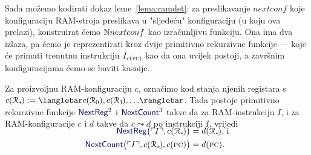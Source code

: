 Sada možemo kodirati dokaz leme~\ref{lema:ramdet}: za preslikavanje $nextconf$ koje konfiguraciju RAM-stroja preslikava u "sljedeću" konfiguraciju (u koju ova prelazi), konstruirat ćemo ${\mathbb N} nextconf$ kao izračunljivu funkciju. Ona ima dva izlaza, pa ćemo je reprezentirati kroz dvije primitivno rekurzivne funkcije --- koje će primati trenutnu instrukciju $I_{c(\textsc{pc})}$ kao da ona uvijek postoji, a završnim konfiguracijama ćemo se baviti kasnije.

\begin{lema}[{name=[primitivna rekurzivnost prijelaza između RAM-konfiguracija]}]\label{lm:NextRegCountprn}
	Za proizvoljnu RAM-konfiguraciju $c$, označimo kod stanja njenih registara s $c(\reg{*}\mspace{-2mu}):=\knk{c(\reg0),c(\reg1\mspace{-2mu}),\dotsc}$. Tada postoje primitivno rekurzivne funkcije $\f{NextReg}^2$ i $\f{NextCount}^3$ takve da za RAM-instrukciju $I$, i za RAM-kon\-fi\-gu\-ra\-ci\-je $c$ i $d$ takve da $c\leadsto d$ po instrukciji $I$, vrijedi
\begin{align}
	\SwapAboveDisplaySkip
	\f{NextReg}\bigl(\kins{I},c(\reg{*}\mspace{-2mu})\bigr)&=d(\reg{*}\mspace{-2mu})\text{, i}\\
	\f{NextCount}\bigl(\kins{I},c(\reg{*}\mspace{-2mu}),c(\textsc{pc})\bigr)&=d(\textsc{pc})\text.
\end{align}
\end{lema}
